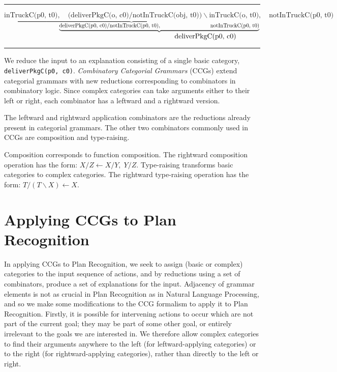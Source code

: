 \noindent\rule{\textwidth}{0.4pt}
{\ttfamily\scriptsize
$\underbrace{\text{inTruckC(p0, t0)},\quad \text{(deliverPkgC(o, c0)}/\text{notInTruckC(obj, t0))}\backslash{}\text{inTruckC(o, t0)}},\quad \text{notInTruckC(p0, t0)}$\\
$\hspace*{10em}\underbrace{\text{deliverPkgC(p0, c0)}/\text{notInTruckC(p0, t0)},\hspace*{9em}\text{notInTruckC(p0, t0)}}$\\
$\hspace*{24em} \text{deliverPkgC(p0, c0)}$
}\\
\noindent\rule{\textwidth}{0.4pt}

We reduce the input to an explanation consisting of a single basic category, \texttt{deliverPkgC(p0, c0)}.
\emph{Combinatory Categorial Grammars}\cite{bib:ccg} (CCGs) extend categorial grammars with new reductions corresponding to combinators in combinatory logic. Since complex categories can take arguments either to their left or right, each combinator has a leftward and a rightward version.

The leftward and rightward application combinators are the reductions already present in categorial grammars. The other two combinators commonly used in CCGs are composition and type-raising.

Composition corresponds to function composition. The rightward composition operation has the form: $X/Z \leftarrow X/Y,\;  Y/Z$. Type-raising transforms basic categories to complex categories. The rightward type-raising operation has the form: $T/(T\backslash X) \leftarrow X$.

\section{Applying CCGs to Plan Recognition}

In applying CCGs to Plan Recognition, we seek to assign (basic or complex) categories to the input sequence of actions, and by reductions using a set of combinators, produce a set of explanations for the input. Adjacency of grammar elements is not as crucial in Plan Recognition as in Natural Language Processing, and so we make some modifications to the CCG formalism to apply it to Plan Recognition.
Firstly, it is possible for intervening actions to occur which are not part of the current goal; they may be part of some other goal, or entirely irrelevant to the goals we are interested in. We therefore allow complex categories to find their arguments anywhere to the left (for leftward-applying categories) or to the right (for rightward-applying categories), rather than directly to the left or right.

